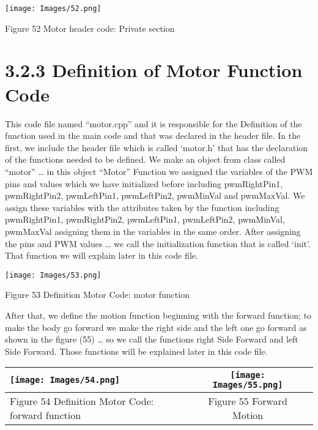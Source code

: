 \documentclass{article}
\begin{document}
\begin{center}
    \texttt{[image: Images/52.png]}

    Figure 52 Motor header code: Private section
\end{center}

\section{3.2.3 Definition of Motor Function Code}

This code file named “motor.cpp” and it is responsible for the Definition of the function used in the main code and that was declared in the header file. In the first, we include the header file which is called ‘motor.h’ that has the declaration of the functions needed to be defined. We make an object from class called “motor” … in this object “Motor” Function we assigned the variables of the PWM pins and values which we have initialized before including pwmRightPin1, pwmRightPin2, pwmLeftPin1, pwmLeftPin2, pwmMinVal and pwmMaxVal. We assign these variables with the attributes taken by the function including pwmRightPin1, pwmRightPin2, pwmLeftPin1, pwmLeftPin2, pwmMinVal, pwmMaxVal assigning them in the variables in the same order. After assigning the pins and PWM values … we call the initialization function that is called ‘init’. That function we will explain later in this code file.

\begin{center}
    \texttt{[image: Images/53.png]}

    Figure 53 Definition Motor Code: motor function
\end{center}

After that, we define the motion function beginning with the forward function; to make the body go forward we make the right side and the left one go forward as shown in the figure (55) … so we call the functions right Side Forward and left Side Forward. Those functions will be explained later in this code file.

\begin{center}
\begin{tabular}{|l|c|r|}
    \hline
    \texttt{[image: Images/54.png]} &  \texttt{[image: Images/55.png]}\\
    \hline
    Figure 54 Definition Motor Code: forward function & Figure 55 Forward Motion\\
    \hline
\end{tabular}
\end{center}
\end{document}
